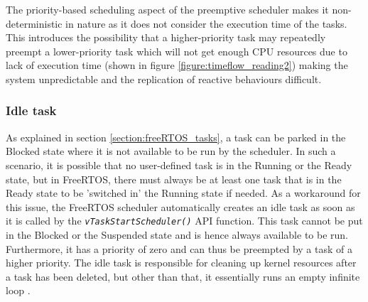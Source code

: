 \documentclass[10pt, a4paper]{article}
\newcommand{\textFunc}[1]{\texttt{\textit{#1}}}
\begin{document}
    The priority-based scheduling aspect of the preemptive scheduler makes it non-deterministic in nature as it does not consider the execution time of the tasks. This introduces the possibility that a higher-priority task may repeatedly preempt a lower-priority task which will not get enough CPU resources due to lack of execution time (shown in figure \ref{figure:timeflow_reading2}) making the system unpredictable and the replication of reactive behaviours difficult.

    \subsubsection{Idle task}
    \label{section:idle-task}
    As explained in section \ref{section:freeRTOS_tasks}, a task can be parked in the Blocked state where it is not available to be run by the scheduler. In such a scenario, it is possible that no user-defined task is in the Running or the Ready state, but in FreeRTOS, there must always be at least one task that is in the Ready state to be 'switched in' the Running state if needed. As a workaround for this issue, the FreeRTOS scheduler automatically creates an idle task as soon as it is called by the \textFunc{vTaskStartScheduler()} API function. This task cannot be put in the Blocked or the Suspended state and is hence always available to be run. Furthermore, it has a priority of zero and can thus be preempted by a task of a higher priority. The idle task is responsible for cleaning up kernel resources after a task has been deleted, but other than that, it essentially runs an empty infinite loop \cite{book:freertos-guide-tasks}.
\end{document}
